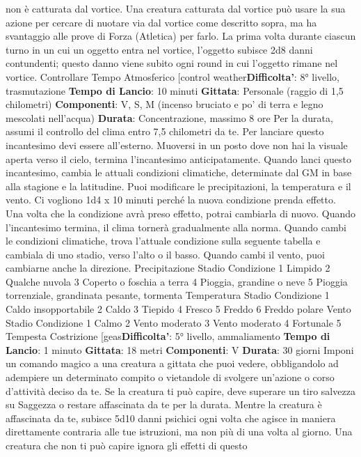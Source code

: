\begin{multicols}{2}
non è catturata dal vortice. Una creatura catturata dal
vortice può usare la sua azione per cercare di nuotare
via dal vortice come descritto sopra, ma ha svantaggio
alle prove di Forza (Atletica) per farlo.
La prima volta durante ciascun turno in un cui un
oggetto entra nel vortice, l’oggetto subisce 2d8 danni
contundenti; questo danno viene subito ogni round in
cui l’oggetto rimane nel vortice.
Controllare Tempo Atmosferico
[control weather\textbf{Difficolta'}:
8° livello, trasmutazione
\textbf{Tempo di Lancio}: 10 minuti
\textbf{Gittata}: Personale (raggio di 1,5 chilometri)
\textbf{Componenti}: V, S, M (incenso bruciato e po’ di terra e
legno mescolati nell’acqua)
\textbf{Durata}: Concentrazione, massimo 8 ore
Per la durata, assumi il controllo del clima entro 7,5
chilometri da te. Per lanciare questo incantesimo devi
essere all’esterno. Muoversi in un posto dove non hai la
visuale aperta verso il cielo, termina l’incantesimo
anticipatamente.
Quando lanci questo incantesimo, cambia le attuali
condizioni climatiche, determinate dal GM in base alla
stagione e la latitudine. Puoi modificare le
precipitazioni, la temperatura e il vento. Ci vogliono 1d4
x 10 minuti perché la nuova condizione prenda effetto.
Una volta che la condizione avrà preso effetto, potrai
cambiarla di nuovo. Quando l’incantesimo termina, il
clima tornerà gradualmente alla norma.
Quando cambi le condizioni climatiche, trova l’attuale
condizione sulla seguente tabella e cambiala di uno
stadio, verso l’alto o il basso. Quando cambi il vento,
puoi cambiarne anche la direzione.
Precipitazione
Stadio Condizione
1 Limpido
2 Qualche nuvola
3 Coperto o foschia a terra
4 Pioggia, grandine o neve
5 Pioggia torrenziale, grandinata pesante, tormenta
Temperatura
Stadio Condizione
1 Caldo insopportabile
2 Caldo
3 Tiepido
4 Fresco
5 Freddo
6 Freddo polare
Vento
Stadio Condizione
1 Calmo
2 Vento moderato
3 Vento moderato
4 Fortunale
5 Tempesta
Costrizione
[geas\textbf{Difficolta'}:
5° livello, ammaliamento
\textbf{Tempo di Lancio}: 1 minuto
\textbf{Gittata}: 18 metri
\textbf{Componenti}: V
\textbf{Durata}: 30 giorni
Imponi un comando magico a una creatura a gittata che
puoi vedere, obbligandolo ad adempiere un determinato
compito o vietandole di svolgere un’azione o corso
d’attività deciso da te. Se la creatura ti può capire, deve
superare un tiro salvezza su Saggezza o restare
affascinata da te per la durata. Mentre la creatura è
affascinata da te, subisce 5d10 danni psichici ogni volta
che agisce in maniera direttamente contraria alle tue
istruzioni, ma non più di una volta al giorno. Una
creatura che non ti può capire ignora gli effetti di questo

\end{multicols}
